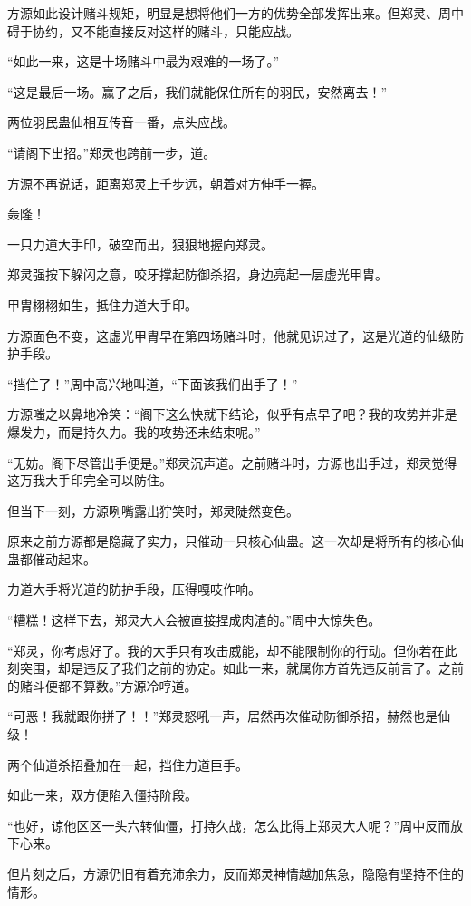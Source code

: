 \begin{this_body}
方源如此设计赌斗规矩，明显是想将他们一方的优势全部发挥出来。但郑灵、周中碍于协约，又不能直接反对这样的赌斗，只能应战。

“如此一来，这是十场赌斗中最为艰难的一场了。”

“这是最后一场。赢了之后，我们就能保住所有的羽民，安然离去！”

两位羽民蛊仙相互传音一番，点头应战。

“请阁下出招。”郑灵也跨前一步，道。

方源不再说话，距离郑灵上千步远，朝着对方伸手一握。

轰隆！

一只力道大手印，破空而出，狠狠地握向郑灵。

郑灵强按下躲闪之意，咬牙撑起防御杀招，身边亮起一层虚光甲胄。

甲胄栩栩如生，抵住力道大手印。

方源面色不变，这虚光甲胄早在第四场赌斗时，他就见识过了，这是光道的仙级防护手段。

“挡住了！”周中高兴地叫道，“下面该我们出手了！”

方源嗤之以鼻地冷笑：“阁下这么快就下结论，似乎有点早了吧？我的攻势并非是爆发力，而是持久力。我的攻势还未结束呢。”

“无妨。阁下尽管出手便是。”郑灵沉声道。之前赌斗时，方源也出手过，郑灵觉得这万我大手印完全可以防住。

但当下一刻，方源咧嘴露出狞笑时，郑灵陡然变色。

原来之前方源都是隐藏了实力，只催动一只核心仙蛊。这一次却是将所有的核心仙蛊都催动起来。

力道大手将光道的防护手段，压得嘎吱作响。

“糟糕！这样下去，郑灵大人会被直接捏成肉渣的。”周中大惊失色。

“郑灵，你考虑好了。我的大手只有攻击威能，却不能限制你的行动。但你若在此刻突围，却是违反了我们之前的协定。如此一来，就属你方首先违反前言了。之前的赌斗便都不算数。”方源冷哼道。

“可恶！我就跟你拼了！！”郑灵怒吼一声，居然再次催动防御杀招，赫然也是仙级！

两个仙道杀招叠加在一起，挡住力道巨手。

如此一来，双方便陷入僵持阶段。

“也好，谅他区区一头六转仙僵，打持久战，怎么比得上郑灵大人呢？”周中反而放下心来。

但片刻之后，方源仍旧有着充沛余力，反而郑灵神情越加焦急，隐隐有坚持不住的情形。


\end{this_body}
